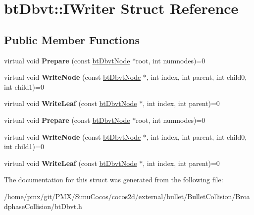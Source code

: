 \hypertarget{structbtDbvt_1_1IWriter}{}\section{bt\+Dbvt\+:\+:I\+Writer Struct Reference}
\label{structbtDbvt_1_1IWriter}
\subsection*{Public Member Functions}
\begin{DoxyCompactItemize}
\item 
\mbox{\label{structbtDbvt_1_1IWriter_a97856d5adb23bd8c9b5e451cb974d425}} 
virtual void {\bfseries Prepare} (const \hyperlink{structbtDbvtNode}{bt\+Dbvt\+Node} $\ast$root, int numnodes)=0
\item 
\mbox{\label{structbtDbvt_1_1IWriter_ad636dcb98208311c00a9d3cf6e91c652}} 
virtual void {\bfseries Write\+Node} (const \hyperlink{structbtDbvtNode}{bt\+Dbvt\+Node} $\ast$, int index, int parent, int child0, int child1)=0
\item 
\mbox{\label{structbtDbvt_1_1IWriter_a55561c4dee82cc69ceb13544ecaf347a}} 
virtual void {\bfseries Write\+Leaf} (const \hyperlink{structbtDbvtNode}{bt\+Dbvt\+Node} $\ast$, int index, int parent)=0
\item 
\mbox{\label{structbtDbvt_1_1IWriter_a97856d5adb23bd8c9b5e451cb974d425}} 
virtual void {\bfseries Prepare} (const \hyperlink{structbtDbvtNode}{bt\+Dbvt\+Node} $\ast$root, int numnodes)=0
\item 
\mbox{\label{structbtDbvt_1_1IWriter_ad636dcb98208311c00a9d3cf6e91c652}} 
virtual void {\bfseries Write\+Node} (const \hyperlink{structbtDbvtNode}{bt\+Dbvt\+Node} $\ast$, int index, int parent, int child0, int child1)=0
\item 
\mbox{\label{structbtDbvt_1_1IWriter_a55561c4dee82cc69ceb13544ecaf347a}} 
virtual void {\bfseries Write\+Leaf} (const \hyperlink{structbtDbvtNode}{bt\+Dbvt\+Node} $\ast$, int index, int parent)=0
\end{DoxyCompactItemize}


The documentation for this struct was generated from the following file\+:\begin{DoxyCompactItemize}
\item 
/home/pmx/git/\+P\+M\+X/\+Simu\+Cocos/cocos2d/external/bullet/\+Bullet\+Collision/\+Broadphase\+Collision/bt\+Dbvt.\+h\end{DoxyCompactItemize}
